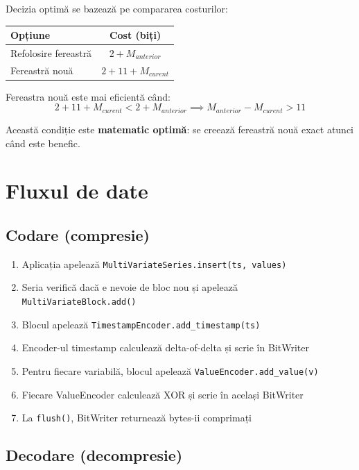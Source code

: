 Decizia optimă se bazează pe compararea costurilor:

\begin{center}
\begin{tabular}{|l|c|}
\hline
\textbf{Opțiune} & \textbf{Cost (biți)} \\
\hline
Refolosire fereastră & $2 + M_{anterior}$ \\
Fereastră nouă & $2 + 11 + M_{curent}$ \\
\hline
\end{tabular}
\end{center}

Fereastra nouă este mai eficientă când:
\begin{equation}
    2 + 11 + M_{curent} < 2 + M_{anterior} \implies M_{anterior} - M_{curent} > 11
\end{equation}

Această condiție este \textbf{matematic optimă}: se creează fereastră nouă exact atunci când este benefic.

\section{Fluxul de date}

\subsection{Codare (compresie)}

\begin{enumerate}
    \item Aplicația apelează \texttt{MultiVariateSeries.insert(ts, values)}
    \item Seria verifică dacă e nevoie de bloc nou și apelează \texttt{MultiVariateBlock.add()}
    \item Blocul apelează \texttt{TimestampEncoder.add\_timestamp(ts)}
    \item Encoder-ul timestamp calculează delta-of-delta și scrie în BitWriter
    \item Pentru fiecare variabilă, blocul apelează \texttt{ValueEncoder.add\_value(v)}
    \item Fiecare ValueEncoder calculează XOR și scrie în același BitWriter
    \item La \texttt{flush()}, BitWriter returnează bytes-ii comprimați
\end{enumerate}

\subsection{Decodare (decompresie)}

